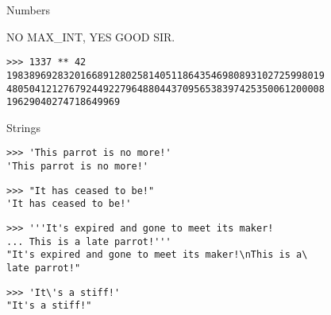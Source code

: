 \documentclass[ignorenonframetext,]{beamer}
\begin{document}
\begin{frame}[fragile]{Numbers}

    NO MAX\_INT, YES GOOD SIR.

    \begin{tcolorbox}
    \begin{verbatim}
>>> 1337 ** 42
19838969283201668912802581405118643546980893102725998019
48050412127679244922796488044370956538397425350061200008
19629040274718649969
    \end{verbatim}
    \end{tcolorbox}
\end{frame}

\begin{frame}[fragile]{Strings}
    \begin{tcolorbox}
    \begin{verbatim}
>>> 'This parrot is no more!'
'This parrot is no more!'
    \end{verbatim}
    \end{tcolorbox}

    \pause
    \begin{tcolorbox}
    \begin{verbatim}
>>> "It has ceased to be!"
'It has ceased to be!'
    \end{verbatim}
    \end{tcolorbox}

    \pause
    \begin{tcolorbox}
    \begin{verbatim}
>>> '''It's expired and gone to meet its maker!
... This is a late parrot!'''
"It's expired and gone to meet its maker!\nThis is a\
late parrot!"
    \end{verbatim}
    \end{tcolorbox}

    \pause
    \begin{tcolorbox}
    \begin{verbatim}
>>> 'It\'s a stiff!'
"It's a stiff!"
    \end{verbatim}
    \end{tcolorbox}
\end{frame}
\end{document}
